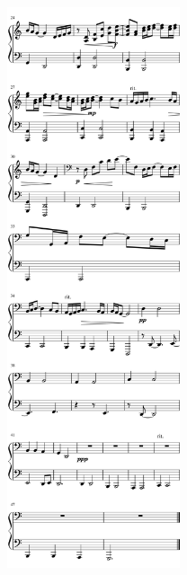 \begin{rightcolumn*}
\noindent\includegraphics[width=2in]{assets/static/miniatures/5-2.png}
\end{rightcolumn*}

